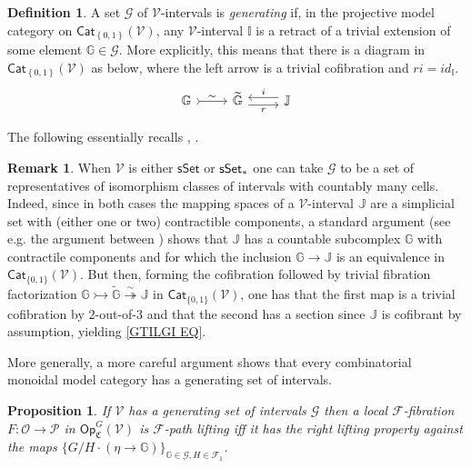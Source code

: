 \documentclass[a4paper,10pt
,draft
]{article}%
\numberwithin{equation}{section}
\numberwithin{figure}{section}
\newtheorem{proposition}[equation]{Proposition}%
\theoremstyle{definition} %
\newtheorem{definition}[equation]{Definition}%
\newtheorem{remark}[equation]{Remark}%
\newcommand{\set}[1]{\left\{#1\right\}}%
\newcommand{\Cat}{\mathsf{Cat}}
\newcommand{\F}{\ensuremath{\mathcal F}}
\newcommand{\V}{\ensuremath{\mathcal V}}
\renewcommand{\O}{\ensuremath{\mathcal O}}
\renewcommand{\P}{\ensuremath{\mathcal P}}
\newcommand{\1}{\ensuremath{\mathbbm 1}}%
\begin{document}
\begin{definition}\label{INTGENSET DEF}
	A set $\mathscr{G}$ of $\V$-intervals is \textit{generating} if,
	in the projective model category on $\Cat_{\set{0,1}}(\V)$,
	any $\V$-interval $\mathbb{I}$ is
	a retract of a trivial extension of some element
	$\mathbb{G} \in \mathscr{G}$.
	More explicitly, this means that there is a diagram in 
	$\Cat_{\set{0,1}}(\V)$ as below,
	where the left arrow is a trivial cofibration and
	$ri = id_{\mathbb{I}}$.
\begin{equation}\label{GTILGI EQ}
	\begin{tikzcd}
		\mathbb{G} \arrow[r,rightarrowtail, "\sim"]
	&
		\widetilde{\mathbb{G}} \arrow[r,yshift=-.3em, "r"']
	&
		\mathbb{J} \arrow[l,yshift=.3em, "i"']
	\end{tikzcd}
\end{equation}
\end{definition}


The following essentially recalls \cite[1.20]{CM13b}, \cite[\S 4.3]{Cav}.


\begin{remark}
      \label{SSETINT_REM}
When $\V$ is either $\mathsf{sSet}$ or $\mathsf{sSet}_{\**}$
one can take $\mathscr{G}$ to be a set of representatives of isomorphism classes of intervals with countably many cells.
Indeed, since in both cases the mapping spaces of a $\V$-interval
$\mathbb{J}$ are a simplicial set with (either one or two) contractible components,
a standard argument (see e.g. the argument between \cite[Lemmas 4.2,4.3]{Ber07b})
shows that $\mathbb{J}$ has a countable subcomplex $\mathbb{G}$ with contractile components and
for which the inclusion 
$\mathbb{G} \to \mathbb{J}$
is an equivalence in $\mathsf{Cat}_{\{0,1\}}(\V)$.
But then, forming the cofibration followed by trivial fibration factorization
$\mathbb{G} \rightarrowtail \widetilde{\mathbb{G}}
\overset{\sim}{\twoheadrightarrow} \mathbb{J}$
in $\mathsf{Cat}_{\{0,1\}}(\V)$,
one has that the first map is a trivial cofibration by $2$-out-of-$3$
and that the second has a section since $\mathbb{J}$ is cofibrant by assumption, yielding \eqref{GTILGI EQ}.

More generally, a more careful argument \cite[Lemma 1.12]{BM13}
shows that every combinatorial monoidal model category
has a generating set of intervals.
\end{remark}



\begin{proposition}\label{GENIN PROP}
If $\V$ has a generating set of intervals $\mathscr{G}$ then a local $\F$-fibration 
$F \colon \O \to \P$ in 
$\mathsf{Op}^G_{\mathfrak{C}}(\V)$
is $\F$-path lifting iff it has the right lifting property against the maps 
$\{G/H \cdot (\eta \to \mathbb{G})\}_{\mathbb{G}\in \mathscr{G},H \in \mathcal{F}_1}$.
\end{proposition}
\end{document}
